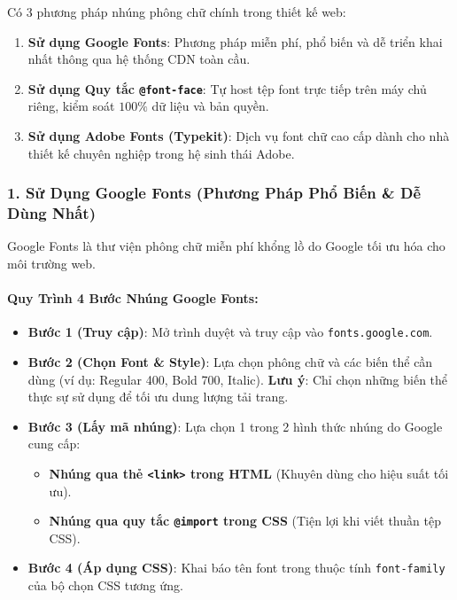 \documentclass[11pt,oneside]{book}
\newcommand{\codeinline}[1]{\textcolor{accentOrange}{\texttt{#1}}}
\begin{document}
\begin{conceptBox}
Có 3 phương pháp nhúng phông chữ chính trong thiết kế web:
\begin{enumerate}[leftmargin=1.5em, itemsep=3pt, parsep=0pt]
    \item \textbf{Sử dụng Google Fonts}: Phương pháp miễn phí, phổ biến và dễ triển khai nhất thông qua hệ thống CDN toàn cầu.
    \item \textbf{Sử dụng Quy tắc \codeinline{@font-face}}: Tự host tệp font trực tiếp trên máy chủ riêng, kiểm soát $100\%$ dữ liệu và bản quyền.
    \item \textbf{Sử dụng Adobe Fonts (Typekit)}: Dịch vụ font chữ cao cấp dành cho nhà thiết kế chuyên nghiệp trong hệ sinh thái Adobe.
\end{enumerate}
\end{conceptBox}

\subsubsection{1. Sử Dụng Google Fonts (Phương Pháp Phổ Biến \& Dễ Dùng Nhất)}

Google Fonts là thư viện phông chữ miễn phí khổng lồ do Google tối ưu hóa cho môi trường web.

\paragraph{Quy Trình 4 Bước Nhúng Google Fonts:}
\begin{itemize}[leftmargin=1.5em, itemsep=4pt, parsep=0pt]
    \item \textbf{Bước 1 (Truy cập)}: Mở trình duyệt và truy cập vào \codeinline{fonts.google.com}.
    \item \textbf{Bước 2 (Chọn Font \& Style)}: Lựa chọn phông chữ và các biến thể cần dùng (ví dụ: Regular 400, Bold 700, Italic). \textbf{Lưu ý}: Chỉ chọn những biến thể thực sự sử dụng để tối ưu dung lượng tải trang.
    \item \textbf{Bước 3 (Lấy mã nhúng)}: Lựa chọn 1 trong 2 hình thức nhúng do Google cung cấp:
    \begin{itemize}[leftmargin=1.2em, itemsep=2pt]
        \item \textbf{Nhúng qua thẻ \codeinline{<link>} trong HTML} (Khuyên dùng cho hiệu suất tối ưu).
        \item \textbf{Nhúng qua quy tắc \codeinline{@import} trong CSS} (Tiện lợi khi viết thuần tệp CSS).
    \end{itemize}
    \item \textbf{Bước 4 (Áp dụng CSS)}: Khai báo tên font trong thuộc tính \codeinline{font-family} của bộ chọn CSS tương ứng.
\end{itemize}
\end{document}
